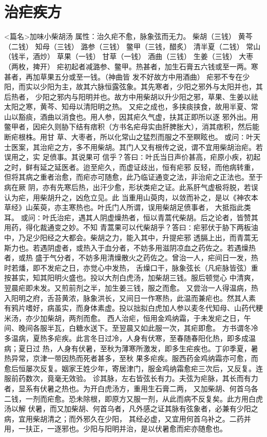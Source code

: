 \documentclass[a4paper,12pt,UTF8,twoside]{ctexbook}
\begin{document}
\chapter{治疟疾方}
<篇名>加味小柴胡汤
属性：治久疟不愈，脉象弦而无力。 
柴胡（三钱） 黄芩（二钱） 知母（三钱） 潞参（三钱） 鳖甲（三钱，醋炙） 清半夏（二钱） 
常山（钱半，酒炒） 草果（一钱） 甘草（一钱） 酒曲（三钱） 生姜（三钱） 大枣（两枚，捭开） 
疟初起者减潞参、鳖甲。热甚者，加生石膏五六钱或至一两。寒甚者，再加草果五分或至一钱。（神曲皆 
发不好故方中用酒曲） 
疟邪不专在少阳，而实以少阳为主，故其六脉恒露弦象。其先寒者，少阳之邪外与太阳并也，其后热者， 
少阳之邪内与阳明并也。故方中用柴胡以升少阳之邪，草果、生姜以祛太阳之寒，黄芩、知母以清阳明之热。 
又疟之成也，多挟痰挟食，故用半夏、常山以豁痰，酒曲以消食也。用人参，因其疟久气虚，扶其正即所以逐 
邪外出。用鳖甲者，因疟久则胁下结有痞积（方书名疟母实由肝脾胀大），消其痞积，然后能断疟根株。用甘 
草、大枣者，所以化常山之猛烈而服之不至瞑眩也。 
或问∶叶天士医案，其治疟之方，多不用柴胡。其门人又有根传之说，谓不宜用柴胡治疟。若误用之，实 
足偾事。其说果可 
信乎？答曰∶叶氏当日声价甚高，疟原小疾，初起之时，鲜有延之延医者。迨至疟久，而虚证歧出，恒有疟邪 
反轻，而他病转重，但将其病之重者治愈，而疟亦可随愈，此乃临证通变之法，非治疟之正法也。至于病在厥 
阴，亦有先寒后热，出汗少愈，形状类疟之证。此系肝气虚极将脱，若误认为疟，用柴胡升之，凶危立见。此 
当重用山萸肉，以敛而补之，是以《神农本草经》山茱萸，亦主寒热也。叶氏门人所谓，误用柴胡足偾事者， 
大抵指此类耳。 
或问∶叶氏治疟，遇其人阴虚燥热者，恒以青蒿代柴胡。后之论者，皆赞其用药，得化裁通变之妙。不知 
青蒿果可以代柴胡乎？答曰∶疟邪伏于胁下两板油中，乃足少阳经之大都会。柴胡之力，能入其中，升提疟邪 
透膈上出，而青蒿无斯力也。若遇阴虚者，或热入于血分者，不妨多用滋阴凉血之药佐之。若遇燥热者，或热 
盛于气分者，不妨多用清燥散火之药佐之。曾治一人，疟间日一发，热时若燔，即不发疟之日，亦觉心中发热， 
舌燥口干，脉象弦长（凡疟脉皆弦）重按甚实，知其阳明火盛也。投以大剂白虎汤，加柴胡三钱。服后顿觉心 
中清爽，翌晨疟即未发。又煎前剂之半，加生姜三钱，服之而愈。 
又尝治一人得温病，热入阳明之府，舌苔黄浓，脉象洪长，又间日一作寒热，此温而兼疟也。然其人素 
有鸦片嗜好，病虽实，而身体素虚。投以拙拟白虎加人参以麦冬代知母、山药代粳米汤，亦少加柴胡，两剂而愈。 
西人治疟，恒用金鸡纳霜，于未发疟之日，午间、晚间各服半瓦，白糖水送下。至翌晨又如此服一次，其疟即愈。 
方书谓冬冷多温病，夏热多疟疾。此言冬日过冷，人身有伏寒，至春随春阳化热，即多成温病；夏日过 
热，人身有伏暑，至秋为薄寒所激发，即多生疟疾也。丁卯季夏，暑热异常，京津一带因热而死者甚多，至秋 
果多疟疾。服西药金鸡纳霜亦可愈，而 
愈后恒屡次反复。姻家王姓少年，寄居津门，服金鸡纳霜愈疟三次后，又反复。连服前药数次，竟毫无效验。 
诊其脉，左右皆弦长有力。夫弦为疟脉，其长而有力者，显系有伏暑之热也。为开白虎汤方，重用生石膏二两， 
又加柴胡、何首乌各二钱，一剂而疟愈。恐未除根，即原方又服一剂，从此而病不反复矣。此方用白虎汤以解 
伏暑，而又加柴胡、何首乌者，凡外感之证其脉有弦象者，必兼有少阳之病，宜用柴胡清之；而外邪久在少阳， 
其经必虚，又宜用何首乌补之。二药并用，一扶正，一逐邪也。少阳与阳明并治，是以伏暑愈而疟亦随愈也。 
\end{document}

